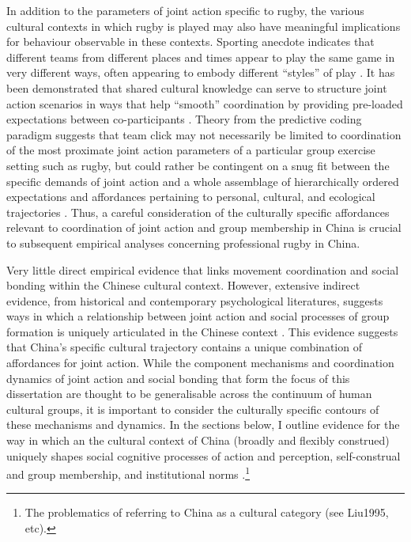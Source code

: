 \begin{CJK}{UTF8}{gbsn}
In addition to the parameters of joint action specific to rugby, the various cultural contexts in which rugby is played may also have meaningful implications for behaviour observable in these contexts.  Sporting anecdote indicates that different teams from different places and times appear to play the same game in very different ways, often appearing to embody different ``styles'' of play \citep{Bourdieu1990,Taylor2010}.  It has been demonstrated that shared cultural knowledge can serve to structure joint action scenarios in ways that help ``smooth'' coordination by providing pre-loaded expectations between co-participants \citep{Vesper2017}.  Theory from the predictive coding paradigm suggests that team click may not necessarily be limited to coordination of the most proximate joint action parameters of a particular group exercise setting such as rugby, but could rather be contingent on a snug fit between the specific demands of joint action and a whole assemblage of hierarchically ordered expectations and affordances pertaining to personal, cultural, and ecological trajectories \citep{Clark2013}.  Thus, a careful consideration of the culturally specific affordances relevant to coordination of joint action and group membership in China is crucial to subsequent empirical analyses concerning professional rugby in China.

Very little direct empirical evidence that links movement coordination and social bonding within the Chinese cultural context.  However, extensive indirect evidence, from historical and contemporary psychological literatures, suggests ways in which a relationship between joint action and social processes of group formation is uniquely articulated in the Chinese context \citep{Weed2011}.  This evidence suggests that China's specific cultural trajectory contains a unique combination of affordances for joint action.  While the component mechanisms and coordination dynamics of joint action and social bonding that form the focus of this dissertation are thought to be generalisable across the continuum of human cultural groups, it is important to consider the culturally specific contours of these mechanisms and dynamics.  In the sections below, I outline evidence for the way in which an the cultural context of China (broadly and flexibly construed) uniquely shapes social cognitive processes of action and perception, self-construal and group membership, and institutional norms \citep{Liu2009}.\footnote{The problematics of referring to China as a cultural category (see Liu1995, etc).}


\end{CJK}
